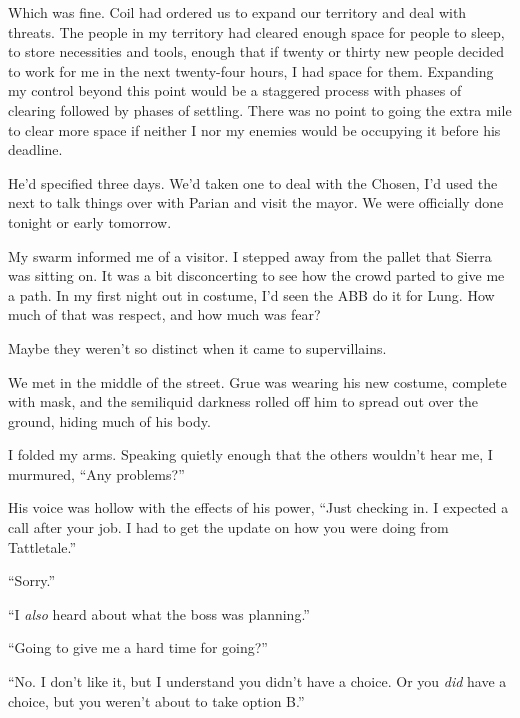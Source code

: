 Which was fine.  Coil had ordered us to expand our territory and deal with threats.  The people in my territory had cleared enough space for people to sleep, to store necessities and tools, enough that if twenty or thirty new people decided to work for me in the next twenty-four hours, I had space for them.  Expanding my control beyond this point would be a staggered process with phases of clearing followed by phases of settling.  There was no point to going the extra mile to clear more space if neither I nor my enemies would be occupying it before his deadline.



He'd specified three days.  We'd taken one to deal with the Chosen, I'd used the next to talk things over with Parian and visit the mayor.  We were officially done tonight or early tomorrow.



My swarm informed me of a visitor.  I stepped away from the pallet that Sierra was sitting on.  It was a bit disconcerting to see how the crowd parted to give me a path.  In my first night out in costume, I'd seen the ABB do it for Lung.  How much of that was respect, and how much was fear?



Maybe they weren't so distinct when it came to supervillains.



We met in the middle of the street.  Grue was wearing his new costume, complete with mask, and the semiliquid darkness rolled off him to spread out over the ground, hiding much of his body.



I folded my arms.  Speaking quietly enough that the others wouldn't hear me, I murmured, ``Any problems?''



His voice was hollow with the effects of his power, ``Just checking in.  I expected a call after your job.  I had to get the update on how you were doing from Tattletale.''



``Sorry.''



``I \emph{also} heard about what the boss was planning.''



``Going to give me a hard time for going?''



``No.  I don't like it, but I understand you didn't have a choice.  Or you \emph{did} have a choice, but you weren't about to take option B.''



